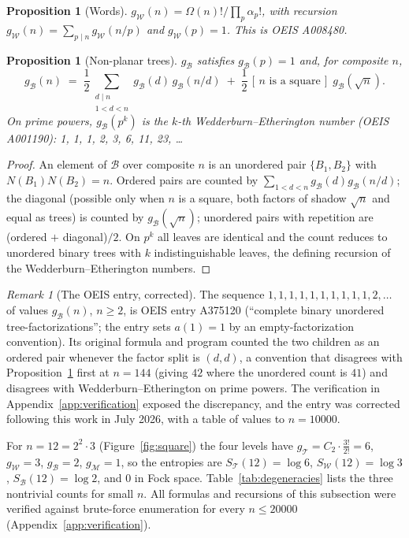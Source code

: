 \documentclass[11pt]{article}
\newcommand{\cT}{\mathcal{T}}   %
\newcommand{\cW}{\mathcal{W}}   %
\newcommand{\cB}{\mathcal{B}}   %
\newcommand{\cM}{\mathcal{M}}   %
\numberwithin{equation}{section}
\theoremstyle{plain}
\newtheorem{proposition}[theorem]{Proposition}
\theoremstyle{definition}
\theoremstyle{remark}
\newtheorem{remark}[theorem]{Remark}
\begin{document}
\begin{proposition}[Words]\label{prop:gW}
$g_\cW(n) = \Omega(n)!/\prod_p \alpha_p!$, with recursion
$g_\cW(n) = \sum_{p \mid n} g_\cW(n/p)$ and $g_\cW(p)=1$. This is OEIS A008480.
\end{proposition}

\begin{proposition}[Non-planar trees]\label{prop:gB}
$g_\cB$ satisfies $g_\cB(p) = 1$ and, for composite $n$,
\[
g_\cB(n) \;=\; \frac12 \sum_{\substack{d \mid n \\ 1<d<n}} g_\cB(d)\, g_\cB(n/d)
\;+\; \frac12\,[\,n \text{ is a square}\,]\; g_\cB(\sqrt n).
\]
On prime powers, $g_\cB(p^k)$ is the $k$-th Wedderburn--Etherington number
(OEIS A001190): 1, 1, 1, 2, 3, 6, 11, 23, \dots
\end{proposition}

\begin{proof}
An element of $\cB$ over composite $n$ is an unordered pair $\{B_1,B_2\}$ with
$N(B_1)N(B_2) = n$. Ordered pairs are counted by $\sum_{1<d<n} g_\cB(d)g_\cB(n/d)$;
the diagonal (possible only when $n$ is a square, both factors of shadow $\sqrt n$ and
equal as trees) is counted by $g_\cB(\sqrt n)$; unordered pairs with repetition are
(ordered $+$ diagonal)$/2$. On $p^k$ all leaves are identical and the count reduces to
unordered binary trees with $k$ indistinguishable leaves, the defining recursion of
the Wedderburn--Etherington numbers.
\end{proof}

\begin{remark}[The OEIS entry, corrected]\label{rem:newseq}
The sequence $1,1,1,1,1,1,1,1,1,1,2,\dots$ of values $g_\cB(n)$, $n \ge 2$, is
OEIS entry A375120 (``complete binary unordered tree-factorizations''; the entry
sets $a(1)=1$ by an empty-factorization convention). Its original formula and program
counted the two children as an ordered pair whenever the factor split is $(d,d)$, a
convention that disagrees with Proposition~\ref{prop:gB} first at $n=144$ (giving
$42$ where the unordered count is $41$) and disagrees with Wedderburn--Etherington
on prime powers. The verification in Appendix~\ref{app:verification} exposed the
discrepancy, and the entry was corrected following this work in July 2026, with a
table of values to $n = 10000$.
\end{remark}

For $n = 12 = 2^2\cdot 3$ (Figure~\ref{fig:square}) the four levels have
$g_\cT = C_2\cdot\tfrac{3!}{2!} = 6$, $g_\cW = 3$, $g_\cB = 2$, $g_\cM = 1$, so the
entropies are $S_\cT(12) = \log 6$, $S_\cW(12) = \log 3$, $S_\cB(12) = \log 2$, and
$0$ in Fock space. Table~\ref{tab:degeneracies} lists the three nontrivial counts for
small $n$. All
formulas and recursions of this subsection were verified against brute-force
enumeration for every $n \le 20000$ (Appendix~\ref{app:verification}).
\end{document}
